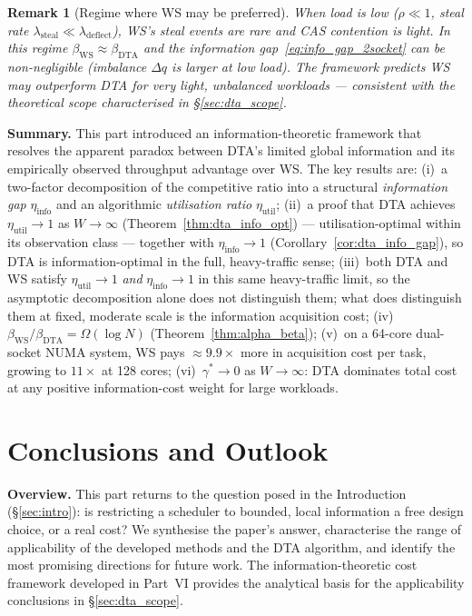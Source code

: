 \documentclass[11pt,a4paper]{article}
\newcommand{\partbreak}{\clearpage\phantomsection}
\newtheorem{remark}{Remark}[section]
\begin{document}
\begin{remark}[Regime where WS may be preferred]
When load is low ($\rho \ll 1$, steal rate $\lambda_{\mathrm{steal}} \ll
\lambda_{\mathrm{deflect}}$), WS's steal events are rare and CAS contention
is light.  In this regime $\beta_{\mathrm{WS}} \approx \beta_{\mathrm{DTA}}$
and the information gap~\eqref{eq:info_gap_2socket} can be non-negligible
(imbalance $\Delta q$ is larger at low load).  The framework predicts
WS may outperform DTA for very light, unbalanced workloads --- consistent
with the theoretical scope characterised in \S\ref{sec:dta_scope}.
\end{remark}

\bigskip
\noindent\textbf{Summary.}
This part introduced an information-theoretic framework that resolves the
apparent paradox between DTA's limited global information and its empirically
observed throughput advantage over WS\@.
The key results are:
(i)~a two-factor decomposition of the competitive ratio into a structural
\emph{information gap} $\eta_{\mathrm{info}}$ and an algorithmic
\emph{utilisation ratio} $\eta_{\mathrm{util}}$;
(ii)~a proof that DTA achieves $\eta_{\mathrm{util}} \to 1$ as $W \to \infty$
(Theorem~\ref{thm:dta_info_opt}) --- utilisation-optimal within its
observation class --- together with $\eta_{\mathrm{info}} \to 1$
(Corollary~\ref{cor:dta_info_gap}), so DTA is information-optimal in the
full, heavy-traffic sense;
(iii)~both DTA and WS satisfy $\eta_{\mathrm{util}} \to 1$ \emph{and}
$\eta_{\mathrm{info}} \to 1$ in this same heavy-traffic limit, so the
asymptotic decomposition alone does not distinguish them; what does
distinguish them at fixed, moderate scale is the information acquisition
cost;
(iv)~$\beta_{\mathrm{WS}}/\beta_{\mathrm{DTA}} = \Omega(\log N)$
(Theorem~\ref{thm:alpha_beta});
(v)~on a 64-core dual-socket NUMA system, WS pays $\approx 9.9\times$ more
in acquisition cost per task, growing to $11\times$ at 128 cores;
(vi)~$\gamma^* \to 0$ as $W \to \infty$: DTA dominates total cost at any
positive information-cost weight for large workloads.

\partbreak
\part{Conclusions and Outlook}

\bigskip
\noindent\textbf{Overview.}
This part returns to the question posed in the Introduction
(\S\ref{sec:intro}): is restricting a scheduler to bounded, local
information a free design choice, or a real cost? We synthesise the
paper's answer, characterise the range of applicability of the developed
methods and the DTA algorithm, and identify the most promising directions
for future work. The information-theoretic cost framework developed in
Part~VI provides the analytical basis for the applicability conclusions
in \S\ref{sec:dta_scope}.
\end{document}
